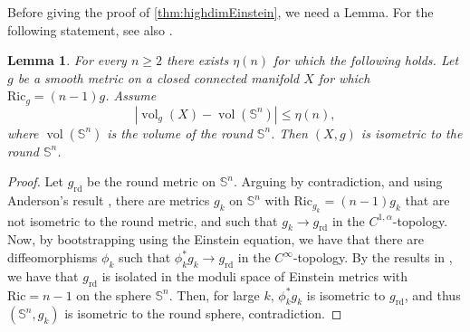 \documentclass[12pt,a4paper,reqno]{amsart}
\newtheorem{lemma}[theorem]{Lemma}
\renewcommand{\leq}{\leqslant}
\renewcommand{\geq}{\geqslant}
\DeclareMathOperator{\vol}{vol}
\begin{document}
Before giving the proof of \cref{thm:highdimEinstein}, we need a Lemma. For the following statement, see also \cite[Theorem 4.3]{Carron}.
\begin{lemma}\label{lemEinstein}
    For every $n\geq 2$ there exists $\eta(n)$ for which the following holds. Let $g$ be a smooth metric on a closed connected manifold $X$ for which $\mathrm{Ric}_g=(n-1)g$. Assume 
    \[
    |\vol_g(X)-\vol(\mathbb S^n)|\leq \eta(n),
    \]
    where $\vol(\mathbb S^n)$ is the volume of the round $\mathbb S^n$. Then $(X,g)$ is isometric to the round $\mathbb S^n$.
\end{lemma}
\begin{proof}
    Let $g_{\mathrm{rd}}$ be the round metric on $\mathbb S^n$. Arguing by contradiction, and using Anderson's result \cite[Theorem 1.2]{Anderson90}, there are metrics $g_k$ on $\mathbb S^n$ with $\mathrm{Ric}_{g_k}=(n-1)g_k$ that are not isometric to the round metric, and such that $g_k\to g_{\mathrm{rd}}$ in the $C^{1,\alpha}$-topology. Now, by bootstrapping using the Einstein equation, we have that there are diffeomorphisms $\phi_k$ such that $\phi_k^*g_k\to g_{\mathrm{rd}}$  in the $C^{\infty}$-topology. By the results in \cite[Chapter 4 \& 12]{BesseBook}, we have that $g_{\mathrm{rd}}$ is isolated in the moduli space of Einstein metrics with $\mathrm{Ric}=n-1$ on the sphere $\mathbb S^n$. Then, for large $k$, $\phi_k^*g_k$ is isometric to $g_{\mathrm{rd}}$, and thus $(\mathbb S^n,g_k)$ is isometric to the round sphere, contradiction.
\end{proof}
\end{document}
